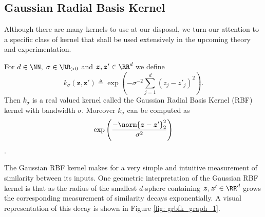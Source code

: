 \subsection{Gaussian Radial Basis Kernel}\label{Section1.3}

Although there are many kernels to use at our disposal, we turn our attention to a specific class of kernel that shall be used extensively in the upcoming theory and experimentation.

\begin{defe} \label{defe: grbfk}
    For $d \in \NN, \; \sigma \in \RR_{>0}$ and $ \bm{z} , \bm{z}' \in \RR^d$ we define
    \[
        k_\sigma \left( \bm{z} , \bm{z}' \right) \triangleq \exp \left( - \sigma^{-2} \sum_{j=1}^{d} \left( {z}_j - {{z}'}_j \right)^2 \right).
    \]
    Then $k_\sigma$ is a real valued kernel called the Gaussian Radial Basis Kernel (RBF) kernel with bandwidth $\sigma$. Moreover $k_\sigma$ can be computed as
    \[
        \exp \left( \frac{- \norm{\bm{z} - {\bm{z}'}}_{2}^{2}}{\sigma^2} \right)
    \]
    \cite{SteinwartIngo2008SVMb}.
\end{defe}
The Gaussian RBF kernel makes for a very simple and intuitive measurement of similarity between its inputs. One geometric interpretation of the Gaussian RBF kernel is that as the radius of the smallest $d$-sphere containing $\bm{z} , \bm{z}' \in \RR^d$ grows the corresponding measurement of similarity decays exponentially. A visual representation of this decay is shown in Figure \ref{fig: grbfk_graph_1}.

